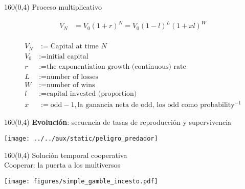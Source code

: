 \documentclass[shownotes,aspectratio=169]{beamer}
\begin{document}
\begin{frame}[plain]
 \begin{textblock}{160}(0,4)
  \centering \Large Proceso multiplicativo
 \end{textblock}
 \vspace{1cm}
 
 
\begin{align*}
 V_N & = V_0 (1+r)^N = V_0 (1-l)^L (1+xl)^W \\
\end{align*}

\vspace{-1cm}
 \begin{align*}
V_N & := \text{Capital at time } N \\
V_0 & := \text{initial capital} \\
r & := \text{the exponentiation growth (continuous) rate} \\
L &:= \text{number of losses} \\
W &:= \text{number of wins} \\
l & := \text{capital invested (proportion)} \\
x & := \text{odd}-1, \text{la ganancia neta de odd, los odd como probability$^{-1}$}
\end{align*} 
 
\end{frame}



\begin{frame}[plain]
 \begin{textblock}{160}(0,4)
  \centering \Large \textbf{Evoluci\'on}: secuencia de tasas de reproducción y supervivencia 
 \end{textblock}
\vspace{1.33cm}
 
 \centering
 \texttt{[image: ../../aux/static/peligro\_predador]}

 
\end{frame}

\begin{frame}[plain]
 \begin{textblock}{160}(0,4)
  \centering \Large Solución temporal cooperativa \\ \normalsize Cooperar: la puerta a los multiversos
 \end{textblock}
 
 \centering
\vspace{1cm}
 
\texttt{[image: figures/simple\_gamble\_incesto.pdf]}

\end{frame}
\end{document}
